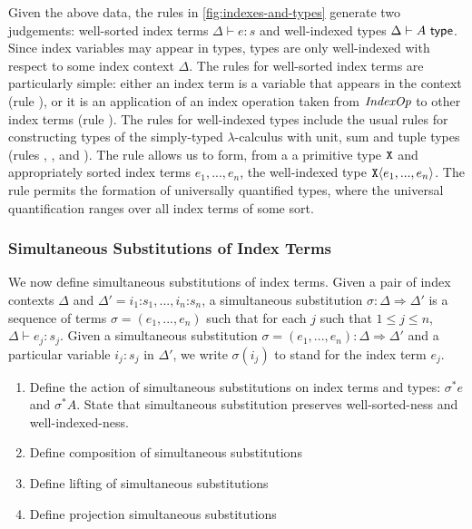 Given the above data, the rules in \autoref{fig:indexes-and-types}
generate two judgements: well-sorted index terms $\Delta \vdash e : s$
and well-indexed types $\Delta \vdash A \textsf{ type}$. Since index
variables may appear in types, types are only well-indexed with
respect to some index context $\Delta$. The rules for well-sorted
index terms are particularly simple: either an index term is a
variable that appears in the context (rule ), or it is
an application of an index operation taken from $\mathit{IndexOp}$ to other
index terms (rule ). The rules for well-indexed types
include the usual rules for constructing types of the simply-typed
$\lambda$-calculus with unit, sum and tuple types (rules
, ,  and
). The rule  allows us to form, from a
a primitive type $\texttt{X}$ and appropriately sorted index terms
$e_1,...,e_n$, the well-indexed type $\texttt{X}\langle e_1,...,e_n \rangle$. The
rule  permits the formation of universally
quantified types, where the universal quantification ranges over all
index terms of some sort.

\subsubsection{Simultaneous Substitutions of Index Terms}
\label{sec:simultaneous-substitution}

We now define simultaneous substitutions of index terms. Given a pair
of index contexts $\Delta$ and $\Delta' = i_1 \mathord: s_1, ..., i_n
\mathord: s_n$, a simultaneous substitution $\sigma : \Delta
\Rightarrow \Delta'$ is a sequence of terms $\sigma = (e_1,...,e_n)$
such that for each $j$ such that $1 \leq j \leq n$, $\Delta \vdash e_j
: s_j$. Given a simultaneous substitution $\sigma = (e_1,...,e_n) :
\Delta \Rightarrow \Delta'$ and a particular variable $i_j : s_j$ in
$\Delta'$, we write $\sigma(i_j)$ to stand for the index term $e_j$.



\begin{enumerate}
\item Define the action of simultaneous substitutions on index terms
  and types: $\sigma^*e$ and $\sigma^*A$. State that simultaneous
  substitution preserves well-sorted-ness and well-indexed-ness.
\item Define composition of simultaneous substitutions
\item Define lifting of simultaneous substitutions
\item Define projection simultaneous substitutions
\end{enumerate}

